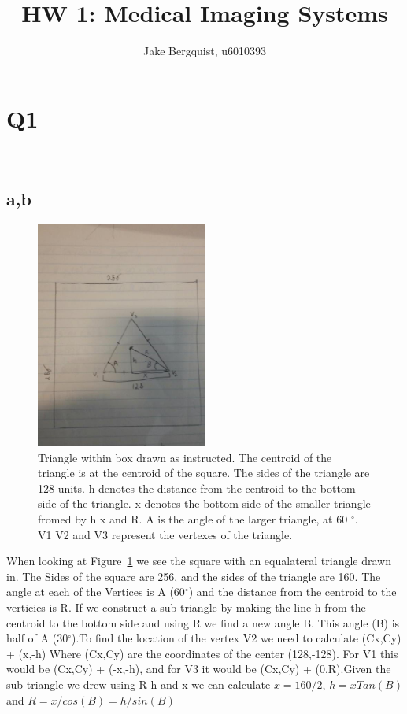 \documentclass[12pt]{article}
\newcommand{\degrees}{{$^{\circ}$}}
\begin{document}
\title{HW 1: Medical Imaging Systems}
\author{Jake Bergquist, u6010393 }
\maketitle

\section{Q1}\
\vspace{-.5in}
\subsection{a,b}
\begin{figure}[h]
	\centering
	\includegraphics[width=0.5\textwidth]{Figures/drawnTriangle.png}
	\caption{Triangle within box drawn as instructed. The centroid of the triangle is at the centroid of the square. The sides of the triangle are 128 units. h denotes the distance from the centroid to the bottom side of the triangle. x denotes the bottom side of the smaller triangle fromed by h x and R. A is the angle of the larger triangle, at 60 \degrees. V1 V2 and V3 represent the vertexes of the triangle.}
	\label{Fig:Drawn_Triangle}
\end{figure}
When looking at Figure~\ref{Fig:Drawn_Triangle} we see the square with an equalateral triangle drawn in. The Sides of the square are 256, and the sides of the triangle are 160. The angle at each of the Vertices is A (60\degrees) and the distance from the centroid to the verticies is R. If we construct a sub triangle by making the line h from the centroid to the bottom side and using R we find a new angle B. This angle (B) is half of A (30\degrees).To find the location of the vertex V2 we need to calculate (Cx,Cy) + (x,-h) Where (Cx,Cy) are the coordinates of the center (128,-128). For V1 this would be (Cx,Cy) + (-x,-h), and for V3 it would be (Cx,Cy) + (0,R).Given the sub triangle we drew using R h and x we can calculate $x = 160/2$, $h = xTan(B)$ and $R = x/cos(B) =  h/sin(B)$
\end{document}

